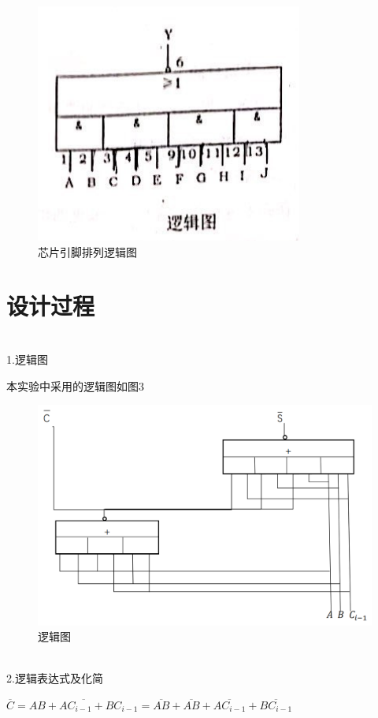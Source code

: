 \documentclass{article}
\begin{document}
\begin{figure}[htbp]
\centering
\includegraphics[scale=0.5]{2.png}
\caption{芯片引脚排列逻辑图}
\label{figure}
\end{figure}

\section{设计过程}

~\\
1.逻辑图

本实验中采用的逻辑图如图3

\begin{figure}[htbp]
\centering
\includegraphics[scale=0.25]{3.png}
\caption{逻辑图}
\label{figure}
\end{figure}

~\\
2.逻辑表达式及化简

$\overline{C}=\overline{AB+AC_{i-1}+BC_{i-1}}=\overline{AB}+\overline{AB}+\overline{AC_{i-1}}+\overline{BC_{i-1}}$
\end{document}
